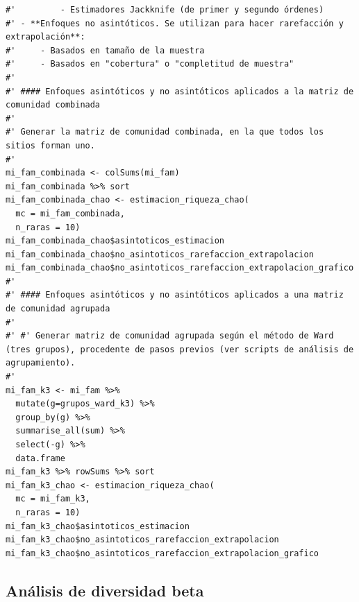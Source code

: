 \documentclass[11pt,]{article}
\begin{document}
\begin{verbatim}
#'         - Estimadores Jackknife (de primer y segundo órdenes)
#' - **Enfoques no asintóticos. Se utilizan para hacer rarefacción y extrapolación**:
#'     - Basados en tamaño de la muestra
#'     - Basados en "cobertura" o "completitud de muestra"
#' 
#' #### Enfoques asintóticos y no asintóticos aplicados a la matriz de comunidad combinada
#' 
#' Generar la matriz de comunidad combinada, en la que todos los sitios forman uno.
#' 
mi_fam_combinada <- colSums(mi_fam)
mi_fam_combinada %>% sort
mi_fam_combinada_chao <- estimacion_riqueza_chao(
  mc = mi_fam_combinada,
  n_raras = 10)
mi_fam_combinada_chao$asintoticos_estimacion
mi_fam_combinada_chao$no_asintoticos_rarefaccion_extrapolacion
mi_fam_combinada_chao$no_asintoticos_rarefaccion_extrapolacion_grafico
#'
#' #### Enfoques asintóticos y no asintóticos aplicados a una matriz de comunidad agrupada
#' 
#' #' Generar matriz de comunidad agrupada según el método de Ward (tres grupos), procedente de pasos previos (ver scripts de análisis de agrupamiento).
#' 
mi_fam_k3 <- mi_fam %>%
  mutate(g=grupos_ward_k3) %>%
  group_by(g) %>%
  summarise_all(sum) %>%
  select(-g) %>% 
  data.frame
mi_fam_k3 %>% rowSums %>% sort
mi_fam_k3_chao <- estimacion_riqueza_chao(
  mc = mi_fam_k3,
  n_raras = 10)
mi_fam_k3_chao$asintoticos_estimacion
mi_fam_k3_chao$no_asintoticos_rarefaccion_extrapolacion
mi_fam_k3_chao$no_asintoticos_rarefaccion_extrapolacion_grafico
\end{verbatim}

\subsection{Análisis de diversidad
beta}\label{anuxe1lisis-de-diversidad-beta}
\end{document}
